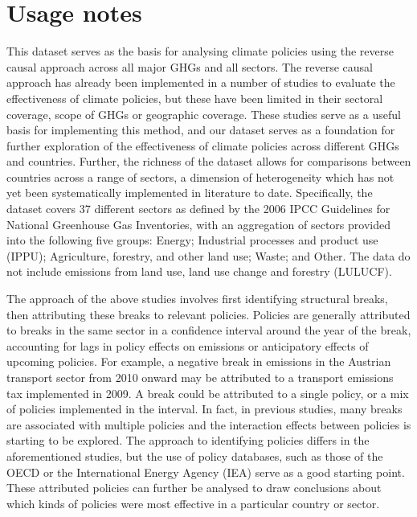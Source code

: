 \documentclass[a4paper]{article}
\begin{document}

\section*{Usage notes}

This dataset serves as the basis for analysing climate policies using the reverse causal approach across all major GHGs and all sectors. The reverse causal approach has already been implemented in a number of studies to evaluate the effectiveness of climate policies, but these have been limited in their sectoral coverage, scope of GHGs or geographic coverage. \cite{stechemesser2024climate,tebecis2023climate,koch2022attributing, yao2022structural} These studies serve as a useful basis for implementing this method, and our dataset serves as a foundation for further exploration of the effectiveness of climate policies across different GHGs and countries. Further, the richness of the dataset allows for comparisons between countries across a range of sectors, a dimension of heterogeneity which has not yet been systematically implemented in literature to date. Specifically, the dataset covers 37 different sectors as defined by the 2006 IPCC Guidelines for National Greenhouse Gas Inventories, with an aggregation of sectors provided into the following five groups: Energy; Industrial processes and product use (IPPU); Agriculture, forestry, and other land use; Waste; and Other. The data do not include emissions from land use, land use change and forestry (LULUCF).

The approach of the above studies involves first identifying structural breaks, then attributing these breaks to relevant policies. Policies are generally attributed to breaks in the same sector in a confidence interval around the year of the break, accounting for lags in policy effects on emissions or anticipatory effects of upcoming policies. For example, a negative break in emissions in the Austrian transport sector from 2010 onward may be attributed to a transport emissions tax implemented in 2009. A break could be attributed to a single policy, or a mix of policies implemented in the interval. In fact, in previous studies, many breaks are associated with multiple policies and the interaction effects between policies is starting to be explored. The approach to identifying policies differs in the aforementioned studies, but the use of policy databases, such as those of the OECD or the International Energy Agency (IEA) serve as a good starting point. These attributed policies can further be analysed to draw conclusions about which kinds of policies were most effective in a particular country or sector.
\end{document}
